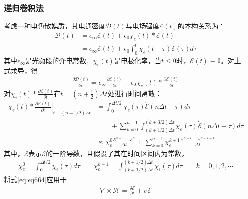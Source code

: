 \documentclass{article}
\numberwithin{equation}{section}
\renewcommand{\vec}[1]{\boldsymbol{#1}}
\begin{document}
\subsubsection{递归卷积法}
考虑一种电色散媒质，其电通密度$\vec{\mathcal{D}}(t)$与电场强度$\vec{\mathcal{E}}(t)$的本构关系为：
\begin{align}
    \label{eq:eq662}
    \vec{\mathcal{D}}(t)&=\epsilon_{\infty}\vec{\mathcal{E}}(t)+\epsilon_0\chi_e(t)\ast \vec{\mathcal{E}}(t) \nonumber \\
                        &=\epsilon_{\infty}\vec{\mathcal{E}}(t)+\epsilon_0\int_0^t\chi_e(t-\tau)\vec{\mathcal{E}}(\tau)d\tau
\end{align}
其中$\epsilon_{\infty}$是光频段的介电常数，$\chi_e(t)$是电极化率，当$t\leq0$时，$\vec{\mathcal{E}}(t)\equiv 0$。对上式求导，得
\begin{align}
    \label{eq:eq663}
    \frac{\partial\vec{\mathcal{D}}(t)}{\partial t}=\epsilon_{\infty}\frac{\partial\vec{\mathcal{E}}(t)}{\partial t}+\epsilon_0\chi_e(t)\ast \frac{\partial\vec{\mathcal{E}}(t)}{\partial t}
\end{align}
对$\chi_e(t)\ast \frac{\partial\vec{\mathcal{E}}(t)}{\partial t}$在$t=\left(n+\frac{1}{2}\right)\Delta t$处进行时间离散：
\begin{align}
    \label{eq:eq664}
    \left.\chi_e(t)\ast \frac{\partial\vec{\mathcal{E}}(t)}{\partial t}\right|_{t=(n+1/2)\Delta t}&=\int_0^{\Delta t/2}\chi_e(\tau)\dot{\vec{\mathcal{E}}}(n\Delta t-\tau)d\tau \nonumber \\
                                                                                                  &\qquad+\sum_{k=0}^{n-1}\int_{(k+1/2)\Delta t}^{(k+3/2)\Delta t}\chi_e(\tau)\dot{\vec{\mathcal{E}}}(n\Delta t-\tau)d\tau \nonumber \\
                                                                                                  &\approx\chi_e^0\frac{\vec{\mathcal{E}}^{n+1}-\vec{\mathcal{E}}^{n}}{\Delta t}+\sum_{k=0}^{n-1}\chi_e^{k+1}\frac{\vec{\mathcal{E}}^{n-k}-\vec{\mathcal{E}}^{n-k-1}}{\Delta t}
\end{align}
其中，$\dot{\vec{\mathcal{E}}}$表示$\vec{\mathcal{E}}$的一阶导数，且假设了其在时间区间内为常数，
\begin{align}
    \label{eq:eq665}
    \chi_e^0=\int_0^{\Delta t/2}\chi_e(\tau)d\tau\qquad\chi_e^{k+1}=\int_{(k+3/2)\Delta t}^{(k+1/2)\Delta t}\chi_e(\tau)d\tau\qquad k=0,1,2,\cdots
\end{align}
将式\ref{eq:eq664}应用于
\begin{align}
    \label{eq:eq666}
    \nabla\times\vec{\mathcal{H}}=\frac{\partial\vec{\mathcal{E}}}{\partial t}+\sigma\vec{\mathcal{E}}
\end{align}
\end{document}
